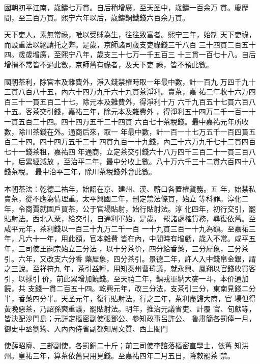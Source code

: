 \documentclass{ctexart}
\begin{document}
國朝初平江南，歲鑄七万貫。自后稍增廣，至天圣中，歲鑄一百余万 貫。慶歷間，至三百万貫。熙宁六年以后，歲鑄銅鐵錢六百余万貫。

天下吏人，素無常祿，唯以受賕為生，往往致富者。熙宁三年，始制 天下吏祿，而設重法以絕請托之弊。是歲，京師諸司歲支吏祿錢三千八百 三十四貫二百五十四。歲歲增廣，至熙宁八年，歲支三十七万一千五百三 十三貫一百七十八。自后增損不常皆不過此數，京師舊有祿者，及天下吏 祿，皆不預此數。

國朝茶利，除官本及雜費外，淨入錢禁榷時取一年最中數，計一百九 万四千九十三貫八百八十五，內六十四万九千六十九貫茶淨利。賣茶，嘉 祐二年收十六万四百三十一貫五百二十七，除元本及雜費外，得淨利十万 六千九百五十七貫六百八十五。客茶交引錢，嘉祐三年，除元本及雜費外 ，得淨利五十四万二千一百一十一貫五百二十四。四十四万五千二十四貫 六百七十茶稅錢。最中嘉祐元年所收數，除川茶錢在外。通商后來，取一 年最中數，計一百一十七万五千一百四貫五百二十四。四十四万五千二十 四貫九百一十九錢，內三十六万九千七十二貫四百七十一錢茶租，嘉祐四 年通商，立定茶交引錢六十八万四千三百二十一貫三百八十，后累經減放 ，至治平二年，最中分收上數。八十万六千三十二貫六百四十八錢茶稅。 最中治平三年，除川茶稅錢外會此數。

本朝茶法：乾德二祐年，始詔在京、建州、漢、蘄口各置榷貨務。五 年，始禁私賣茶，從不應為情理重。太平興國二年，刪定禁法條貫，始立 等科罪。淳化二年，令商賈就園戶買茶，公于官場貼射，始行貼射法。淳 化四年，初行交引，罷貼射法。西北入粟，給交引，自通利軍始。是歲， 罷諸處榷貨務，尋復依舊。至咸平元年，茶利錢以一百三十九万二千一百 一十九貫三百一十九為額。至嘉祐三年，凡六十一年，用此額，官本雜費 皆在內，中間時有增虧，歲入不常。咸平五年，三司使王嗣宗始立三分法 ，以十分茶价，四分給香藥，三分犀象，三分茶引。六年，又改支六分香 藥犀象，四分茶引。景德二年，許人入中錢帛金銀，謂之三說。至祥符九 年，茶引益輕，用知秦州曹瑋議，就永興、鳳翔以官錢收買客引，以捄引 价，前此累增加饒錢。至天禧二年，鎮戎軍納大麥一斗，本价通加饒，共 支錢一貫二百五十四。乾興元年，改三分法，支茶引三分，東南見錢二分 半，香藥四分半。天圣元年，復行貼射法，行之三年，茶利盡歸大商，官 場但得黃晚惡茶，乃詔孫奭重議，罷貼射法。明年，推治元議省吏、計覆 官、旬獻等，皆決配沙門島；元詳定樞密副使張鄧公、參知政事呂許公、 魯肅簡各罰俸一月，御史中丞劉筠、入內內侍省副都知周文質、西上閤門

使薛昭廓、三部副使，各罰銅二十斤；前三司使李諮落樞密直學士，依舊 知洪州。皇祐三年，算茶依舊只用見錢。至嘉祐四年二月五日，降敕罷茶 禁。
\end{document}

